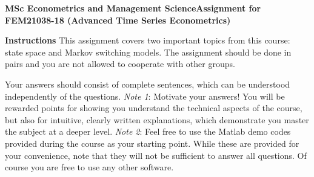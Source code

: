 \documentclass[12pt, a4paper]{article}
\begin{document}
\noindent\textbf{MSc Econometrics and Management Science}\newline \textbf{Assignment for FEM21038-18 (Advanced Time Series Econometrics)}\newline

\medskip\noindent
\textbf{Instructions}
\bigskip\newline\noindent This assignment covers two important topics from this course: state space and Markov switching models. The assignment should be done in pairs and you are not allowed to cooperate with other groups. 

Your answers should consist of complete sentences, which can be understood independently of the questions. 
 \medskip\newline\noindent
\emph{Note 1}: Motivate your answers! You will be rewarded points for showing you understand the technical aspects of the course, but also for intuitive, clearly written explanations, which demonstrate you master the subject at a deeper level. 
\medskip\newline\noindent
\emph{Note 2}: Feel free to use the Matlab demo codes provided during the course as your starting point. While these are provided for your convenience, note that they will not be sufficient to answer all questions. Of course you are free to use any other software. 
\newline
\end{document}

